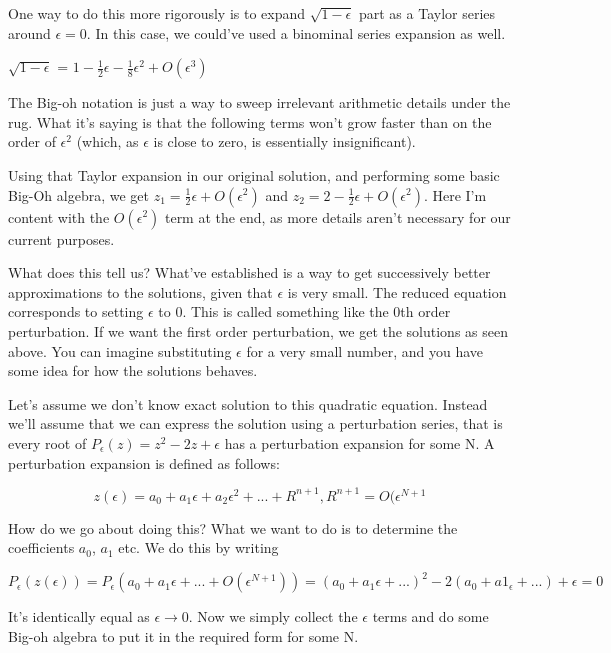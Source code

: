 \documentclass[12pt]{report}
\begin{document}
One way to do this more rigorously is to expand $\sqrt{1-\epsilon}$
part as a Taylor series around $\epsilon = 0$. In this case, we
could've used a binominal series expansion as well.

$\sqrt{1 - \epsilon}$ = $1 - \frac 1 2 \epsilon - \frac 1 8 \epsilon^2
+ O(\epsilon^3)$

The Big-oh notation is just a way to sweep irrelevant arithmetic
details under the rug. What it's saying is that the following terms
won't grow faster than on the order of $\epsilon^2$
(which, as $\epsilon$ is close to zero, is essentially insignificant).

Using that Taylor expansion in our original solution, and performing some basic
Big-Oh algebra, we get $z_1 = \frac 1 2 \epsilon + O(\epsilon^2)$ and $z_2 = 2 -
\frac 1 2 \epsilon + O(\epsilon^2)$. Here I'm content with the $O(\epsilon^2)$
term at the end, as more details aren't necessary for our current purposes.

What does this tell us? What've established is a way to get successively better
approximations to the solutions, given that $\epsilon$ is very small. The
reduced equation corresponds to setting $\epsilon$ to $0$. This is called
something like the 0th order perturbation. If we want the first order
perturbation, we get the solutions as seen above. You can imagine
substituting $\epsilon$ for a very small number, and you have some idea for how
the solutions behaves.

Let's assume we don't know exact solution to this quadratic equation. Instead
we'll assume that we can express the solution using a perturbation series, that
is every root of $P_\epsilon(z) = z^2 - 2z + \epsilon$ has a perturbation
expansion for some N. A perturbation expansion is defined as follows:

\begin{equation}
  z(\epsilon) = a_0 + a_1 \epsilon + a_2 \epsilon^2 + ...  + R^{n+1}, R^{n+1} = O(\epsilon^{N+1}
\end{equation}

How do we go about doing this? What we want to do is to determine the
coefficients $a_0$, $a_1$ etc. We do this by writing

$$P_\epsilon(z(\epsilon)) = P_\epsilon(a_0 + a_1\epsilon + ... +
O(\epsilon^{N+1})) = (a_0 + a_1\epsilon + ...)^2 - 2(a_0 + a1_\epsilon
+ ...) + \epsilon = 0$$

It's identically equal as $\epsilon \to 0$. Now we simply collect the
$\epsilon$ terms and do some Big-oh algebra to put it in the required
form for some N.
\end{document}
